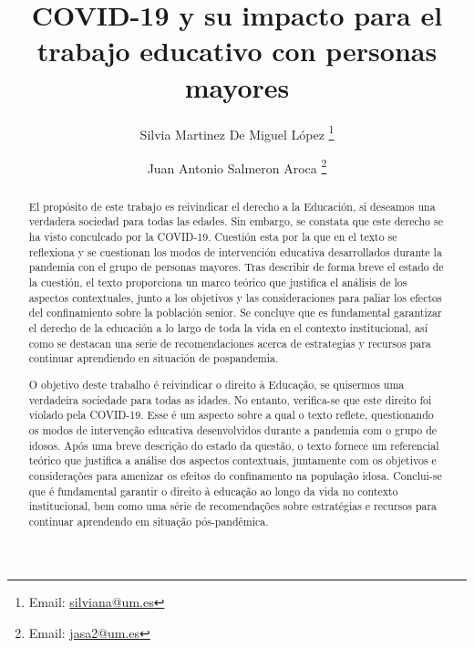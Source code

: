 \documentclass[spanish]{textolivre}
\title{COVID-19 y su impacto para el trabajo educativo con personas mayores}
\author[1]{Silvia Martinez De Miguel López \orcid{0000-0001-7602-8796} \thanks{Email: \url{silviana@um.es}}}
\author[1]{Juan Antonio Salmeron Aroca \orcid{0000-0001-9482-2555} \thanks{Email: \url{jasa2@um.es}}}
\affil[1]{Universidad de Murcia. Facultad de 
Educación. Departamento de Teoría e Historia de la Educación, Murcia, España.}
\begin{document}
\maketitle

\begin{polyabstract}
\begin{abstract}
El propósito de este trabajo es reivindicar el derecho a la Educación, si deseamos una verdadera sociedad para todas las edades. Sin embargo, se constata que este derecho se ha visto conculcado por la COVID-19. Cuestión esta por la que en el texto se reflexiona y se cuestionan los modos de intervención educativa desarrollados durante la pandemia con el grupo de personas mayores. Tras describir de forma breve el estado de la cuestión, el texto proporciona un marco teórico que justifica el análisis de los aspectos contextuales, junto a los objetivos y las consideraciones para paliar los efectos del confinamiento sobre la población senior. Se concluye que es fundamental garantizar el derecho de la educación a lo largo de toda la vida en el contexto institucional, así como se destacan una serie de recomendaciones acerca de estrategias y recursos para continuar aprendiendo en situación de pospandemia.

\end{abstract}

\begin{portuguese}
\begin{abstract}
O objetivo deste trabalho é reivindicar o direito à Educação, se quisermos uma verdadeira sociedade para todas as idades. No entanto, verifica-se que este direito foi violado pela COVID-19. Esse é um aspecto sobre a qual o texto reflete, questionando os modos de intervenção educativa desenvolvidos durante a pandemia com o grupo de idosos. Após uma breve descrição do estado da questão, o texto fornece um referencial teórico que justifica a análise dos aspectos contextuais, juntamente com os objetivos e considerações para amenizar os efeitos do confinamento na população idosa. Conclui-se que é fundamental garantir o direito à educação ao longo da vida no contexto institucional, bem como uma série de recomendações sobre estratégias e recursos para continuar aprendendo em situação pós-pandêmica.

\end{abstract}
\end{portuguese}


\end{polyabstract}
\end{document}
